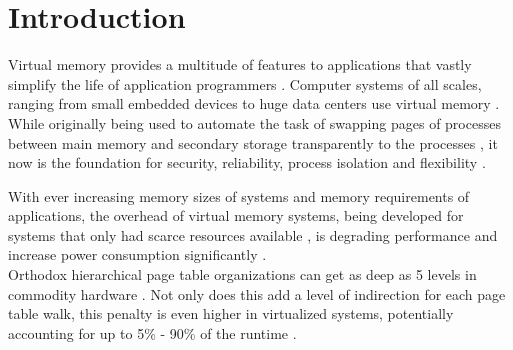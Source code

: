 \chapter{Introduction} %


















Virtual memory provides a multitude of features to applications that vastly simplify the life of application programmers \cite{jacob1998virtualissues}. Computer systems of all scales, ranging from small embedded devices to huge data centers use virtual memory \cite{bhattacharjee2017architectural}.\\
While originally being used to automate the task of swapping pages of processes between main memory and secondary storage transparently to the processes \cite{jacob1998virtualissues}, it now is the foundation for security, reliability, process isolation and flexibility \cite{wales1999virtual,jacobVirtualMemoryContemporary1998}.

With ever increasing memory sizes of systems and memory requirements of applications, the overhead of virtual memory systems, being developed for systems that only had scarce resources available \cite{halbuer2023morsels}, is degrading performance and increase power consumption significantly \cite{zagieboylo2020cost}.\\
Orthodox hierarchical page table organizations \cite{tanenbaumOS} can get as deep as 5 levels in commodity hardware \cite{intel5LevelPaging5Level2017}. Not only does this add a level of indirection for each page table walk, this penalty is even higher in virtualized systems, potentially accounting for up to 5\% - 90\% of the runtime \cite{yaniv2016hash}.


